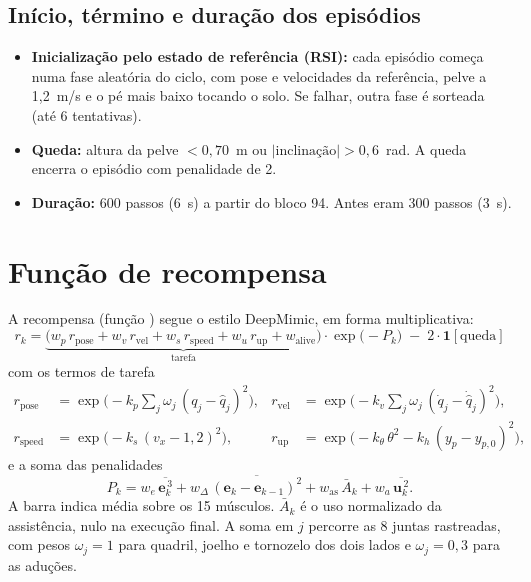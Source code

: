 \documentclass[11pt,a4paper]{article}
\begin{document}
\subsection{Início, término e duração dos episódios}
\begin{itemize}
  \item \textbf{Inicialização pelo estado de referência (RSI):} cada episódio começa numa fase aleatória do
        ciclo, com pose e velocidades da referência, pelve a 1{,}2~m/s e o pé mais baixo tocando o solo. Se
         falhar, outra fase é sorteada (até 6 tentativas).
  \item \textbf{Queda:} altura da pelve $<0{,}70$~m ou $|\text{inclinação}|>0{,}6$~rad. A queda encerra o
        episódio com penalidade de 2.
  \item \textbf{Duração:} 600 passos (6~s) a partir do bloco 94. Antes eram 300 passos (3~s).
\end{itemize}

\section{Função de recompensa}
A recompensa (função ) segue o estilo DeepMimic, em forma multiplicativa:
\begin{equation}
\boxed{\,r_k = \underbrace{\big(w_p\,r_{\mathrm{pose}} + w_v\,r_{\mathrm{vel}} + w_s\,r_{\mathrm{speed}} + w_u\,r_{\mathrm{up}} + w_{\mathrm{alive}}\big)}_{\text{tarefa}}
\cdot \exp\!\big(-P_k\big) \;-\; 2\cdot\mathbf 1[\text{queda}]\,}
\end{equation}
com os termos de tarefa
\begin{align}
r_{\mathrm{pose}}  &= \exp\!\Big(-k_p \sum_{j} \omega_j\,(q_j-\hat q_j)^2\Big), &
r_{\mathrm{vel}}   &= \exp\!\Big(-k_v \sum_{j} \omega_j\,(\dot q_j-\dot{\hat q}_j)^2\Big), \\
r_{\mathrm{speed}} &= \exp\!\big(-k_s\,(v_x - 1{,}2)^2\big), &
r_{\mathrm{up}}    &= \exp\!\big(-k_\theta\,\theta^2 - k_h\,(y_p - y_{p,0})^2\big),
\end{align}
e a soma das penalidades
\begin{equation}
P_k = w_e\,\overline{\mathbf e_k^{\,3}} + w_{\Delta}\,\overline{(\mathbf e_k-\mathbf e_{k-1})^2}
      + w_{\mathrm{as}}\,\bar A_k + w_a\,\overline{\mathbf u_k^{\,2}} .
\end{equation}
A barra indica média sobre os 15 músculos. $\bar A_k$ é o uso normalizado da assistência, nulo na execução
final. A soma em $j$ percorre as 8 juntas rastreadas, com pesos $\omega_j=1$ para quadril, joelho e
tornozelo dos dois lados e $\omega_j=0{,}3$ para as aduções.
\end{document}
